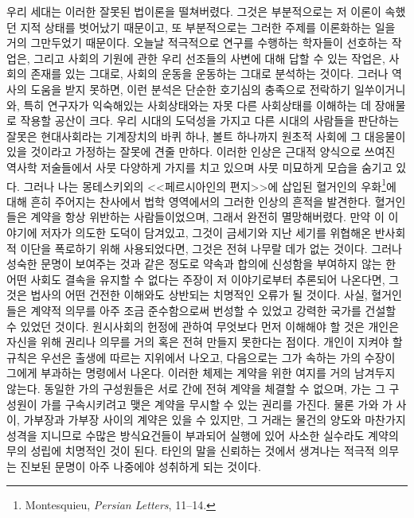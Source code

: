 우리 세대는 이러한 잘못된 법이론을 떨쳐버렸다.
그것은 부분적으로는 저 이론이 속했던 지적 상태를 벗어났기 때문이고,
또 부분적으로는 그러한 주제를 이론화하는 일을 거의 그만두었기 때문이다.
오늘날 적극적으로 연구를 수행하는 학자들이 선호하는 작업은,
그리고 사회의 기원에 관한 우리 선조들의 사변에 대해 답할 수 있는 작업은,
사회의 존재를 있는 그대로, 사회의 운동을 운동하는 그대로 분석하는 것이다.
그러나 역사의 도움을 받지 못하면,
이런 분석은 단순한 호기심의 충족으로 전락하기 일쑤이거니와,
특히
연구자가 익숙해있는 사회상태와는 자못 다른 사회상태를 이해하는 데
장애물로 작용할 공산이 크다.
우리 시대의 도덕성을 가지고 다른 시대의 사람들을 판단하는 잘못은
현대사회라는 기계장치의 바퀴 하나, 볼트 하나까지
원초적 사회에 그 대응물이 있을 것이라고 가정하는 잘못에 견줄 만하다.
이러한 인상은
근대적 양식으로 쓰여진 역사학 저술들에서
사뭇 다양하게 가지를 치고 있으며
사뭇 미묘하게 모습을 숨기고 있다.
그러나
나는
몽테스키외의
<<페르시아인의 편지>>에 삽입된
혈거인의 우화\footnote{%
  \latinmarks
  Montesquieu, \textit{Persian Letters}, 11--14.
}에 대해
흔히 주어지는 찬사에서
법학 영역에서의 그러한 인상의 흔적을 발견한다.
혈거인들은 계약을 항상 위반하는 사람들이었으며, 그래서 완전히 멸망해버렸다.
만약 이 이야기에 저자가 의도한 도덕이 담겨있고,
그것이
금세기와 지난 세기를 위협해온 반사회적 이단을
폭로하기 위해 사용되었다면,
그것은 전혀 나무랄 데가 없는 것이다.
그러나
성숙한 문명이 보여주는 것과 같은 정도로
약속과 합의에 신성함을 부여하지 않는 한
어떤 사회도 결속을 유지할 수 없다는
주장이
저 이야기로부터
추론되어 나온다면,
그것은 법사의 어떤 건전한 이해와도 상반되는 치명적인 오류가
될 것이다.
사실,
혈거인들은 계약적 의무를 아주 조금 준수함으로써
번성할 수 있었고 강력한 국가를 건설할 수 있었던 것이다.
원시사회의 헌정에 관하여
무엇보다 먼저 이해해야 할 것은
개인은 자신을 위해 권리나 의무를 거의 혹은 전혀 만들지 못한다는 점이다.
개인이 지켜야 할 규칙은 우선은 출생에 따르는 지위에서 나오고,
다음으로는 그가 속하는 가의 수장이 그에게 부과하는
명령에서 나온다.
이러한 체제는 계약을 위한 여지를 거의 남겨두지 않는다.
동일한 가의 구성원들은
서로 간에 전혀 계약을 체결할 수 없으며,
가는 그 구성원이 가를 구속시키려고 맺은 계약을
무시할 수 있는 권리를 가진다.
물론 가와 가 사이, 가부장과 가부장 사이의 계약은 있을 수 있지만,
그 거래는 물건의 양도와 마찬가지 성격을 지니므로
수많은 방식요건들이 부과되어
실행에 있어
사소한 실수라도 계약의무의 성립에 치명적인 것이 된다.
타인의 말을 신뢰하는 것에서 생겨나는 적극적 의무는
진보된 문명이 아주 나중에야 성취하게 되는 것이다.

